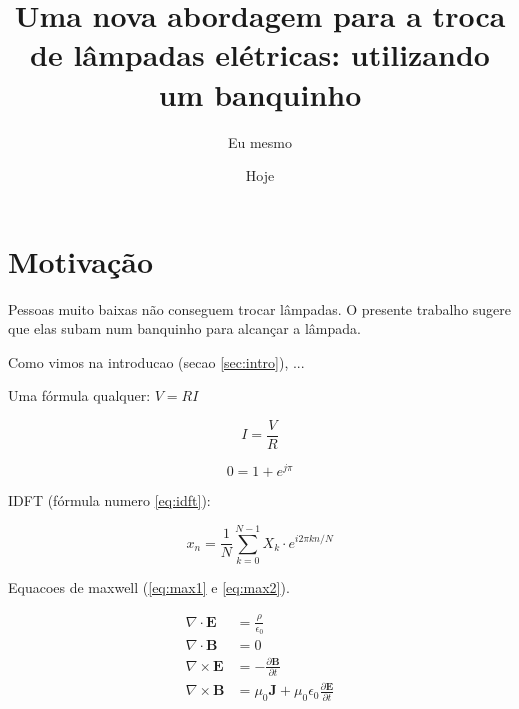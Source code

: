 \documentclass{report}
\author{Eu mesmo}
\date{Hoje}
\title{Uma nova abordagem para a troca de
       lâmpadas elétricas: utilizando um banquinho}
\newcommand{\vetor}[1]{\textbf{#1}}
\begin{document}
\maketitle




\chapter{Motivação}
\label{sec:motiv}

Pessoas muito baixas não conseguem trocar lâmpadas.
O presente trabalho sugere que elas subam num
banquinho para alcançar a lâmpada.

\hfill

Como vimos na introducao (secao \ref{sec:intro}),
...

Uma fórmula qualquer: $V=R I$

$$I = \frac{V}{R}$$

$$0=1+e^{j\pi}$$

IDFT (fórmula numero \ref{eq:idft}):

\begin{equation}
\label{eq:idft}
x_n = \frac{1}{N}
\sum_{k=0}^{N-1} X_k \cdot
e^{i2\pi kn/N}
\end{equation}

Equacoes de maxwell (\ref{eq:max1} e \ref{eq:max2}).

\begin{align}
\label{eq:max1}
\nabla \cdot \vetor{E} & = \frac{\rho}{\epsilon_0} \\
\label{eq:max2}
\nabla \cdot \vetor{B} & = 0 \\
\nabla \times \vetor{E}
& = - \frac{\partial \vetor{B}}{\partial t} \\
\nabla \times \vetor{B} & =
\mu_0\vetor{J} + \mu_0 \epsilon_0
\frac{\partial \vetor{E}}{\partial t}
\end{align}
\end{document}
